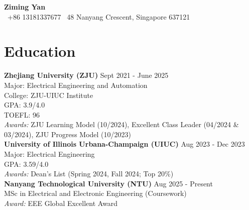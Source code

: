 \documentclass[a4paper,10pt]{article}
\begin{document}
\begin{center}
    {\LARGE \textbf{Ziming Yan}}\\
    \vspace{2mm}
    \href{mailto:ziming005@e.ntu.edu.sg}   \quad
    \faPhone*~+86 13181337677 \quad
    \faMapMarker*~48 Nanyang Crescent, Singapore 637121\\
\end{center}

\section*{Education}
\textbf{Zhejiang University (ZJU)} \hfill Sept 2021 - June 2025\\
Major: Electrical Engineering and Automation\\
College: ZJU-UIUC Institute\\
GPA: 3.9/4.0\\
TOEFL: 96\\
\textit{Awards:} ZJU Learning Model (10/2024), Excellent Class Leader (04/2024 \& 03/2024), ZJU Progress Model (10/2023)\\[2mm]
\textbf{University of Illinois Urbana-Champaign (UIUC)} \hfill Aug 2023 - Dec 2023\\
Major: Electrical Engineering \\
GPA: 3.59/4.0\\
\textit{Awards:} Dean's List (Spring 2024, Fall 2024; Top 20\%)\\[2mm]
\textbf{Nanyang Technological University (NTU)} \hfill Aug 2025 - Present\\
MSc in Electrical and Electronic Engineering (Coursework)\\
\textit{Award:} EEE Global Excellent Award
\end{document}
